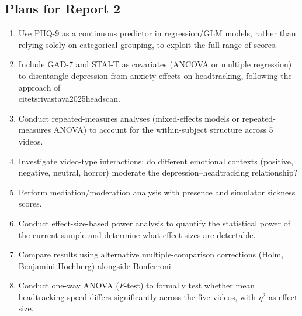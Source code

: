 \documentclass[12pt]{article}
\begin{document}
\subsection{Plans for Report 2}
\begin{enumerate}
    \item Use PHQ-9 as a continuous predictor in regression/GLM models, rather than relying solely on categorical grouping, to exploit the full range of scores.
    \item Include GAD-7 and STAI-T as covariates (ANCOVA or multiple regression) to disentangle depression from anxiety effects on headtracking, following the approach of \\citet{srivastava2025headscan}.
    \item Conduct repeated-measures analyses (mixed-effects models or repeated-measures ANOVA) to account for the within-subject structure across 5 videos.
    \item Investigate video-type interactions: do different emotional contexts (positive, negative, neutral, horror) moderate the depression--headtracking relationship?
    \item Perform mediation/moderation analysis with presence and simulator sickness scores.
    \item Conduct effect-size-based power analysis to quantify the statistical power of the current sample and determine what effect sizes are detectable.
    \item Compare results using alternative multiple-comparison corrections (Holm, Benjamini-Hochberg) alongside Bonferroni.
    \item Conduct one-way ANOVA ($F$-test) to formally test whether mean headtracking speed differs significantly across the five videos, with $\eta^2$ as effect size.
\end{enumerate}


\end{document}
